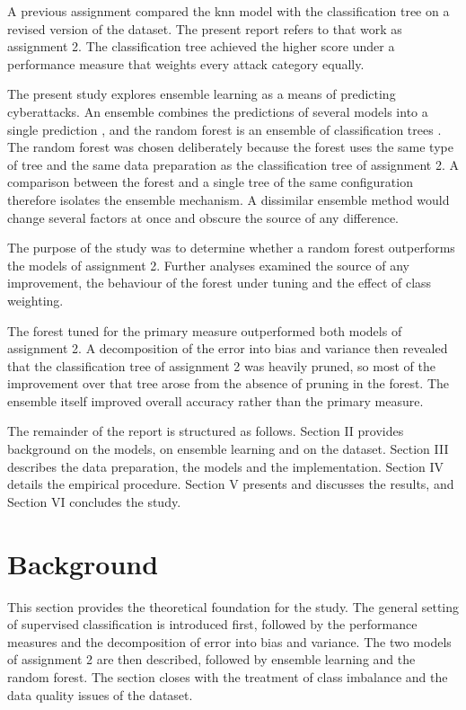 \documentclass[conference]{IEEEtran}
\begin{document}
A previous assignment compared the \gls{knn} model with the classification tree
on a revised version of the dataset. The present report refers to that work as
assignment 2. The classification tree achieved the higher score under a
performance measure that weights every attack category equally.

The present study explores ensemble learning as a means of predicting
cyberattacks. An ensemble combines the predictions of several models into a
single prediction \cite{dietterich2000}, and the random forest is an ensemble of
classification trees \cite{breiman2001}. The random forest was chosen
deliberately because the forest uses the same type of tree and the same data
preparation as the classification tree of assignment 2. A comparison between the
forest and a single tree of the same configuration therefore isolates the
ensemble mechanism. A dissimilar ensemble method would change several factors at
once and obscure the source of any difference.

The purpose of the study was to determine whether a random forest outperforms the
models of assignment 2. Further analyses examined the source of any improvement,
the behaviour of the forest under tuning and the effect of class weighting.

The forest tuned for the primary measure outperformed both models of
assignment 2. A decomposition of the error into bias and variance then revealed
that the classification tree of assignment 2 was heavily pruned, so most of the
improvement over that tree arose from the absence of pruning in the forest. The
ensemble itself improved overall accuracy rather than the primary measure.

The remainder of the report is structured as follows. Section II provides
background on the models, on ensemble learning and on the dataset. Section III
describes the data preparation, the models and the implementation. Section IV
details the empirical procedure. Section V presents
and discusses the results, and Section VI concludes the study.

\section{Background}

This section provides the theoretical foundation for the study. The general
setting of supervised classification is introduced first, followed by the
performance measures and the decomposition of error into bias and variance. The
two models of assignment 2 are then described, followed by ensemble learning and
the random forest. The section closes with the treatment of class imbalance and
the data quality issues of the dataset.
\end{document}
